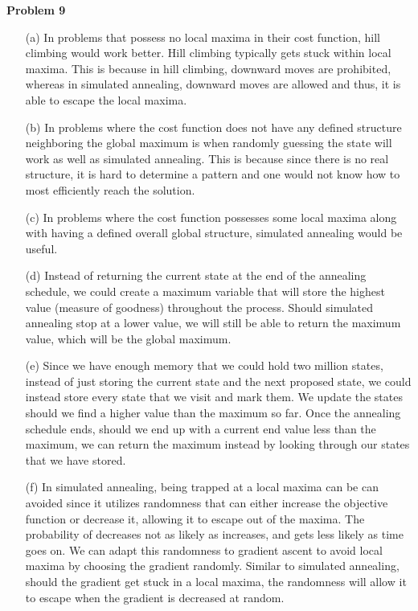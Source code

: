 \documentclass[11pt]{article}
\begin{document}
    \begin{center}
        \Large
        \textbf{Problem 9}
    \end{center}
    \normalsize
    \begin{enumerate}
        \item[(a)] 
        In problems that possess no local maxima in their cost function, hill climbing would work better. Hill climbing typically gets stuck within             local maxima. This is because in hill climbing, downward moves are prohibited, whereas in simulated annealing, downward moves are allowed               and thus, it is able to escape the local maxima.
        
        \item[(b)] %
        In problems where the cost function does not have any defined structure neighboring the global maximum is when randomly guessing the state                  will work as well as simulated annealing. This is because since there is no real structure, it is hard to determine a pattern and one                   would not know how to most efficiently reach the solution.
        \item[(c)] %
        In problems where the cost function possesses some local maxima along with having a defined overall global structure, simulated annealing               would be useful. 
        \item[(d)] %
        Instead of returning the current state at the end of the annealing schedule, we could create a maximum variable that will store the highest             value (measure of goodness) throughout the process. Should simulated annealing stop at a lower value, we will still be able to return the               maximum value, which will be the global maximum. 

        \item[(e)] %
        Since we have enough memory that we could hold two million states, instead of just storing the current state and the next proposed state, we            could instead store every state that we visit and mark them. We update the states should we find a higher value than the maximum so far. Once           the annealing schedule ends, should we end up with a current end value less than the maximum, we can return the maximum instead by looking              through our states that we have stored. 

        \item[(f)] %
        In simulated annealing, being trapped at a local maxima can be can avoided since it utilizes randomness that can either increase the objective          function or decrease it, allowing it to escape out of the maxima. The probability of decreases not as likely as increases, and gets less                likely as time goes on. We can adapt this randomness to gradient ascent to avoid local maxima by choosing the gradient randomly. Similar to               simulated annealing, should the gradient get stuck in a local maxima, the randomness will allow it to escape when the gradient is                         decreased at random.
    \end{enumerate}
\end{document}
